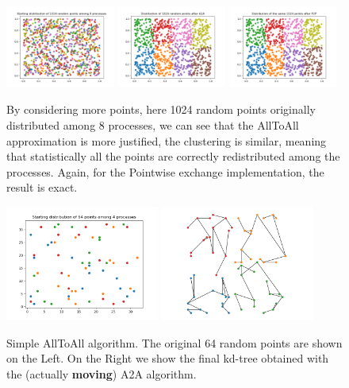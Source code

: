 \documentclass[amssymb, aps,nofootinbib, superscriptaddress, notitlepage]{revtex4}
\begin{document}
\begin{figure}
  \centering
  \includegraphics[width=0.32\textwidth]{img/Starting_1024.png}
      \includegraphics[width=0.32\textwidth]{img/A2A_1024.png}
      \includegraphics[width=0.32\textwidth]{img/P2P_1024.png}
 \caption{By considering more points, here 1024 random points originally distributed among 8 processes, we can see that the AllToAll approximation is more justified, the clustering is similar, meaning that statistically all the points are correctly redistributed among the processes. Again,  for the Pointwise exchange implementation, the result is exact.}
\label{Comparison_1024}
\end{figure}


\begin{figure}
  \centering
      \includegraphics[width=0.45\textwidth]{img/Starting_64.png}
            \includegraphics[width=0.45\textwidth]{img/mpiA2A.png}
 \caption{Simple AllToAll algorithm. 
 The original 64 random points are shown on the Left. 
On the Right we show the final kd-tree obtained with the (actually  \textbf{moving})  A2A algorithm.}
\label{A2A}
\end{figure}
\end{document}
